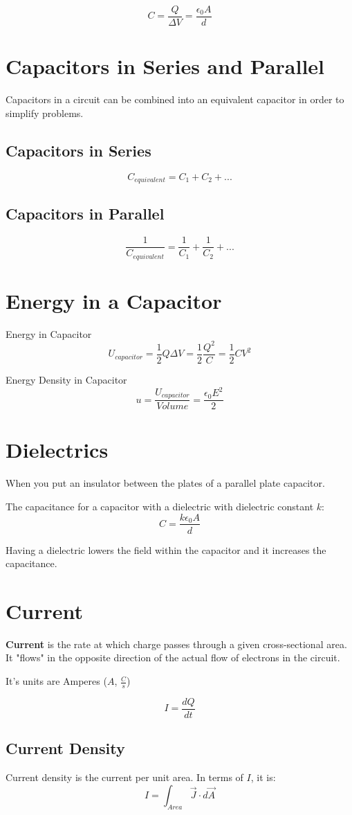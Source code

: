 \documentclass[10pt, a4paper, twocolumn]{article}
\begin{document}
    $$C = \frac{Q}{\Delta V} = \frac{\epsilon_0 A}{d}$$ 


    \section{Capacitors in Series and Parallel}	
        Capacitors in a circuit can be combined into an equivalent capacitor in order to simplify problems.
        \subsection{Capacitors in Series}
        $$C_{equivalent} = C_1 + C_2 + ...$$
        \subsection{Capacitors in Parallel}
        $$\frac{1}{C_{equivalent}} = \frac{1}{C_1} + \frac{1}{C_2} + ...$$
    \section{Energy in a Capacitor}	
        Energy in Capacitor
        $$U_{capacitor} = \frac{1}{2}Q \Delta V = \frac{1}{2} \frac{Q^2}{C} = \frac{1}{2} C V^2$$

        Energy Density in Capacitor
        $$u = \frac{U_{capacitor}}{Volume} = \frac{\epsilon_0 E^2}{2}$$
    \section{Dielectrics}	
        When you put an insulator between the plates of a parallel plate capacitor.

        The capacitance for a capacitor with a dielectric with dielectric constant $k$:
        $$C = \frac{k \epsilon_0 A}{d}$$

        Having a dielectric lowers the field within the capacitor and it increases the capacitance.
    \section{Current}	
        \textbf{Current} is the rate at which charge passes through a given cross-sectional area. It "flows" in the opposite direction of the actual flow of electrons in the circuit.

        It's units are Amperes ($A$, $\frac{C}{s}$)

        $$I = \frac{dQ}{dt}$$

        \subsection{Current Density}
            Current density is the current per unit area. In terms of $I$, it is:
            $$I = \int_{Area} \vec{J} \cdot d \vec{A}$$
\end{document}
